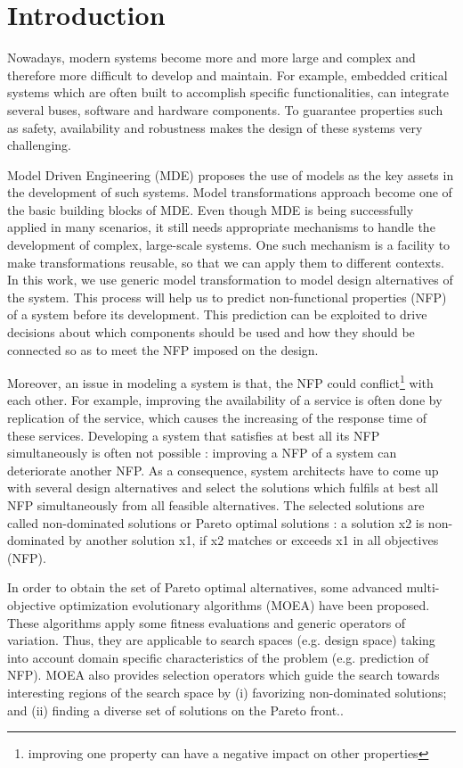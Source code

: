 \documentclass[conference]{IEEEtran}
\begin{document}
\IEEEpeerreviewmaketitle

\section{Introduction}
Nowadays, modern systems become more and more large and complex and therefore more difficult to develop and maintain. For example, embedded critical systems which are often built to accomplish specific functionalities, can integrate several buses, software and hardware components. To guarantee properties such as safety, availability and robustness makes the design of these systems very challenging.

Model Driven Engineering (MDE) proposes the use of models as the key assets in the development of such systems. Model transformations approach become one of the basic building blocks of MDE. Even though MDE is being successfully applied in many scenarios, it still needs appropriate mechanisms to handle the development of complex, large-scale systems. One such mechanism is a facility to make transformations reusable, so that we can apply them to different contexts. In this work, we use generic model transformation to model design alternatives of the system. This process will help us to predict non-functional properties (NFP) of a system before its development\cite{1291833}. This prediction can be exploited to drive decisions about which components should be used and how they should be connected so as to meet the NFP imposed on the design.

Moreover, an issue in modeling a system is that, the NFP could conflict\footnote{improving one property can have a negative impact on other properties} with each other. For example, improving the availability of a service is often done by replication of the service, which causes the increasing of the response time of these services\cite{Yu:2001:CLA:502059.502038}. Developing a system that satisfies at best all its NFP simultaneously is often not possible : improving a NFP of a system can deteriorate another NFP. As a consequence, system architects have to come up with several design alternatives and select the solutions which fulfils at best all NFP\cite{Coello98acomprehensive} simultaneously from all feasible alternatives. The selected solutions are called non-dominated solutions or Pareto optimal solutions : a solution x2 is non-dominated by another solution x1, if x2 matches or exceeds x1 in all objectives (NFP).

In order to obtain the set of Pareto optimal alternatives, some advanced multi-objective optimization evolutionary algorithms (MOEA) have been proposed. These algorithms apply some fitness evaluations and generic operators of variation. Thus, they are applicable to search spaces (e.g. design space) taking into account domain specific characteristics of the problem (e.g. prediction of NFP). MOEA also provides selection operators which guide the search towards interesting regions of the search space by (i) favorizing non-dominated solutions; and (ii) finding a diverse set of solutions on the Pareto front..
\end{document}
